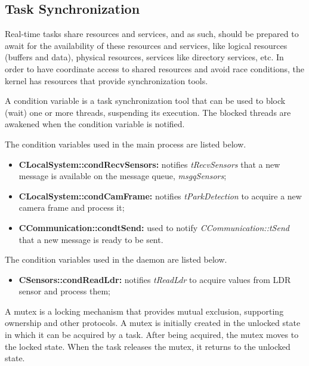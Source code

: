 \clearpage
\subsection{Task Synchronization}
Real-time tasks share resources and services, and as such, should be prepared to await for the availability of these resources and services, like logical resources (buffers and data), physical resources, services like directory services, etc. In order to have coordinate access to shared resources and avoid race conditions, the kernel has resources that provide synchronization tools. 


A condition variable is a task synchronization tool that can be used to block (wait) one or more threads, suspending its execution. The blocked threads are awakened when the condition variable is notified. 

The condition variables used in the main process are listed below.

\begin{itemize}
	\item \textbf{CLocalSystem::condRecvSensors:} notifies \textit{tRecvSensors} that a new message is available on the message queue, \textit{msgqSensors};

	\item \textbf{CLocalSystem::condCamFrame:} notifies \textit{tParkDetection} to acquire a new camera frame and process it;

	\item \textbf{CCommunication::condtSend:} used to notify \textit{CCommunication::tSend} that a new message is ready to be sent.
\end{itemize}

The condition variables used in the daemon are listed below.

\begin{itemize}
	\item \textbf{CSensors::condReadLdr:} notifies \textit{tReadLdr} to acquire values from LDR sensor and process them;
\end{itemize}


A mutex is a locking mechanism that provides mutual exclusion, supporting ownership and other protocols. A mutex is initially created in the unlocked state in which it can be acquired by a task. After being acquired, the mutex moves to the locked state. When the task releases the mutex, it returns to the unlocked state.

